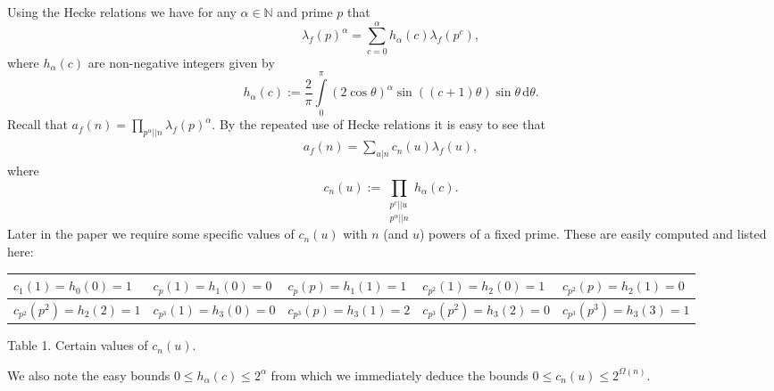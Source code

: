 \documentclass[a4paper,10pt,twoside]{amsart}
\theoremstyle{definition}
\numberwithin{equation}{section}
\newcommand\N{\mathbb{N}}
\renewcommand\:{\colon}
\begin{document}
\noindent Using the Hecke relations we have for any $\alpha\in\N$ and prime $p$ that
\[
\lambda_f\left(p\right)^\alpha=\sum_{c=0}^\alpha h_\alpha(c)\lambda_f\left(p^c\right), 
\]
where $h_\alpha(c)$ are non-negative integers given by
\[ 
h_\alpha(c):=\frac2\pi\int\limits_0^\pi(2\cos\theta)^\alpha\sin((c+1)\theta)\sin\theta\,\mathrm d \theta.
\]
Recall that $a_f(n)=\prod_{p^\alpha||n}\lambda_f(p)^\alpha$. By the repeated use of Hecke relations it is easy to see that 
\begin{align}\label{a-function}
a_f(n)=\sum_{u|n}c_n(u)\lambda_f(u),
\end{align}
where 
\[ 
c_n(u):=\prod_{\substack{p^c||u \\
p^\alpha||n}}h_\alpha(c).
\]
Later in the paper we require some specific values of $c_n(u)$ with $n$ (and $u$) powers of a fixed prime. These are easily computed and listed here:
\begin{center}
\begin{tabular}{ | m{3cm} | m{3cm} | m{3cm} | m{3cm} | m{3cm} |} 
  \hline
  $c_1(1)=h_0(0)=1$ & $c_p(1)=h_1(0)=0$ & $c_p(p)=h_1(1)=1$ & $c_{p^2}(1)=h_2(0)=1$ & $c_{p^2}(p)=h_2(1)=0$  \\ 
  \hline
  $c_{p^2}(p^2)=h_2(2)=1$ & $c_{p^3}(1)=h_3(0)=0$ & $c_{p^3}(p)=h_3(1)=2$ & $c_{p^3}(p^2)=h_3(2)=0$ & $c_{p^3}(p^3)=h_3(3)=1$\\ 
  \hline 
  \end{tabular}
  \medskip
Table 1. Certain values of $c_n(u)$.
\end{center}
\noindent We also note the easy bounds $0\leq h_\alpha(c)\leq 2^{\alpha}$ from which we immediately deduce the bounds $0\leq c_n(u)\leq 2^{\Omega(n)}$. 
\end{document}
